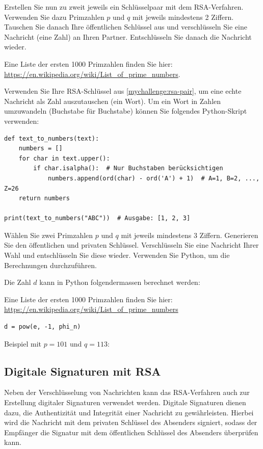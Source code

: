 \begin{mychallenge}\label{mychallenge:rsa-pair}
 Erstellen Sie nun zu zweit jeweils ein Schlüsselpaar mit dem \gls{RSA}-Verfahren. Verwenden Sie dazu Primzahlen \( p \) und \( q \) mit jeweils mindestens 2 Ziffern. Tauschen Sie danach Ihre öffentlichen Schlüssel aus und verschlüsseln Sie eine Nachricht (eine Zahl) an Ihren Partner. Entschlüsseln Sie danach die Nachricht wieder.
 
 Eine Liste der ersten 1000 Primzahlen finden Sie hier: \url{https://en.wikipedia.org/wiki/List_of_prime_numbers}.
\end{mychallenge}

\begin{mychallenge}
Verwenden Sie Ihre RSA-Schlüssel aus \ref{mychallenge:rsa-pair}, um eine echte Nachricht als Zahl auszutauschen (ein Wort). Um ein Wort in Zahlen umzuwandeln (Buchstabe für Buchstabe) können Sie folgendes Python-Skript verwenden:
\begin{lstlisting}
def text_to_numbers(text):
	numbers = []
	for char in text.upper():
		if char.isalpha():  # Nur Buchstaben berücksichtigen
			numbers.append(ord(char) - ord('A') + 1)  # A=1, B=2, ..., Z=26
	return numbers

print(text_to_numbers("ABC"))  # Ausgabe: [1, 2, 3]
\end{lstlisting}
\end{mychallenge}

\begin{mychallenge}
	Wählen Sie zwei Primzahlen \( p \) und \( q \) mit jeweils mindestens 3 Ziffern. Generieren Sie den öffentlichen und privaten Schlüssel. Verschlüsseln Sie eine Nachricht Ihrer Wahl und entschlüsseln Sie diese wieder. Verwenden Sie Python, um die Berechnungen durchzuführen.

	Die Zahl $d$ kann in Python folgendermassen berechnet werden:

	Eine Liste der ersten 1000 Primzahlen finden Sie hier: \url{https://en.wikipedia.org/wiki/List_of_prime_numbers}
	\begin{lstlisting}
d = pow(e, -1, phi_n)
	\end{lstlisting}
	\begin{myanswer}
		Beispiel mit \( p = 101 \) und \( q = 113 \):
		
	\end{myanswer}
\end{mychallenge}

\subsection{Digitale Signaturen mit \texorpdfstring{\acrshort{RSA}}{RSA}}
Neben der Verschlüsselung von Nachrichten kann das \gls{RSA}-Verfahren auch zur Erstellung digitaler Signaturen verwendet werden. Digitale Signaturen dienen dazu, die Authentizität und Integrität einer Nachricht zu gewährleisten. Hierbei wird die Nachricht mit dem privaten Schlüssel des Absenders signiert, sodass der Empfänger die Signatur mit dem öffentlichen Schlüssel des Absenders überprüfen kann.

